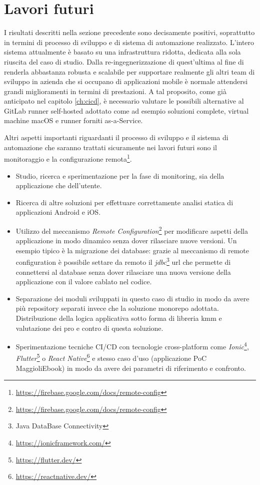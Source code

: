\section{Lavori futuri}
I risultati descritti nella sezione precedente sono decisamente positivi, soprattutto in termini di processo di sviluppo e di sistema di automazione realizzato. L'intero sistema attualmente è basato su una infrastruttura ridotta, dedicata alla sola riuscita del caso di studio. Dalla re-ingegnerizzazione di quest'ultima al fine di renderla abbastanza robusta e scalabile per supportare realmente gli altri team di sviluppo in azienda che si occupano di applicazioni mobile è normale attendersi grandi miglioramenti in termini di prestazioni. A tal proposito, come già anticipato nel capitolo \ref{ch:cicd}, è necessario valutare le possibili alternative al GitLab runner self-hosted adottato come ad esempio soluzioni complete, virtual machine macOS e runner forniti as-a-Service.

Altri aspetti importanti riguardanti il processo di sviluppo e il sistema di automazione che saranno trattati sicuramente nei lavori futuri sono il monitoraggio e la configurazione remota\footnote{\href{https://firebase.google.com/docs/remote-config}{https://firebase.google.com/docs/remote-config}}. %



\begin{itemize}
        \item Studio, ricerca e sperimentazione per la fase di monitoring, sia della applicazione che dell'utente.
        \item Ricerca di altre soluzioni per effettuare correttamente analisi statica di applicazioni Android e iOS.
        \item Utilizzo del meccanismo \textit{Remote Configuration}\footnote{\url{https://firebase.google.com/docs/remote-config}} per modificare aspetti della applicazione in modo dinamico senza dover rilasciare nuove versioni. Un esempio tipico è la migrazione dei database: grazie al meccanismo di remote configuration è possibile settare da remoto il \textit{jdbc}\footnote{Java DataBase Connectivity} url che permette di connettersi al database senza dover rilasciare una nuova versione della applicazione con il valore cablato nel codice.
        \item Separazione dei moduli sviluppati in questo caso di studio in modo da avere più repository separati invece che la soluzione monorepo adottata. Distribuzione della logica applicativa sotto forma di libreria kmm e valutazione dei pro e contro di questa soluzione.
        \item Sperimentazione tecniche CI/CD con tecnologie cross-platform come \textit{Ionic}\footnote{\url{https://ionicframework.com/}}, \textit{Flutter}\footnote{\url{https://flutter.dev/}} o \textit{React Native}\footnote{\url{https://reactnative.dev/}} e stesso caso d'uso (applicazione PoC MaggioliEbook) in modo da avere dei parametri di riferimento e confronto.
\end{itemize}